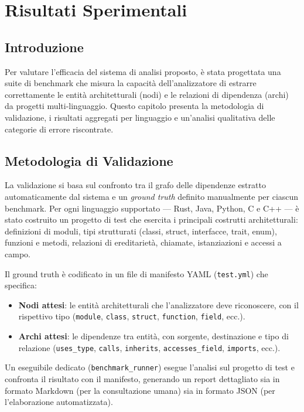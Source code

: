 \chapter{Risultati Sperimentali}

\section{Introduzione}
Per valutare l'efficacia del sistema di analisi proposto, è stata
progettata una suite di benchmark che misura la capacità
dell'analizzatore di estrarre correttamente le entità architetturali
(nodi) e le relazioni di dipendenza (archi) da progetti
multi-linguaggio. Questo capitolo presenta la metodologia di
validazione, i risultati aggregati per linguaggio e un'analisi
qualitativa delle categorie di errore riscontrate.

\section{Metodologia di Validazione}
La validazione si basa sul confronto tra il grafo delle dipendenze
estratto automaticamente dal sistema e un \textit{ground truth}
definito manualmente per ciascun benchmark. Per ogni linguaggio
supportato --- Rust, Java, Python, C e C++ --- è stato costruito un
progetto di test che esercita i principali costrutti architetturali:
definizioni di moduli, tipi strutturati (classi, struct, interfacce,
trait, enum), funzioni e metodi, relazioni di ereditarietà, chiamate,
istanziazioni e accessi a campo.

Il ground truth è codificato in un file di manifesto YAML
(\texttt{test.yml}) che specifica:
\begin{itemize}
  \item \textbf{Nodi attesi}: le entità architetturali che
    l'analizzatore deve riconoscere, con il rispettivo tipo
    (\texttt{module}, \texttt{class}, \texttt{struct}, \texttt{function},
    \texttt{field}, ecc.).
  \item \textbf{Archi attesi}: le dipendenze tra entità, con sorgente,
    destinazione e tipo di relazione (\texttt{uses\_type},
      \texttt{calls}, \texttt{inherits}, \texttt{accesses\_field},
    \texttt{imports}, ecc.).
\end{itemize}

Un eseguibile dedicato (\texttt{benchmark\_runner}) esegue l'analisi
sul progetto di test e confronta il risultato con il manifesto,
generando un report dettagliato sia in formato Markdown (per la
consultazione umana) sia in formato JSON (per l'elaborazione
automatizzata).

